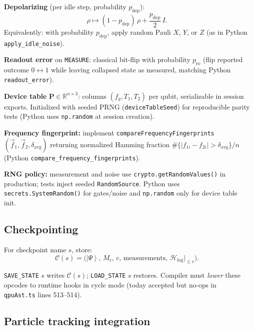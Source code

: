 \documentclass[11pt,a4paper]{article}
\newcommand{\R}{\mathbb{R}}
\newcommand{\ket}[1]{\left|#1\right\rangle}
\newcommand{\HS}{\mathcal{H}_{\mathrm{log}}}
\begin{document}
\textbf{Depolarizing} (per idle step, probability $p_{\mathrm{dep}}$):
\begin{equation}
  \rho \mapsto (1-p_{\mathrm{dep}})\,\rho + \frac{p_{\mathrm{dep}}}{2}\, I.
\end{equation}
Equivalently: with probability $p_{\mathrm{dep}}$, apply random Pauli $X$, $Y$, or $Z$ (as in Python \texttt{apply\_idle\_noise}).

\textbf{Readout error} on \texttt{MEASURE}: classical bit-flip with probability $p_{\mathrm{ro}}$ (flip reported outcome $0\leftrightarrow 1$ while leaving collapsed state as measured, matching Python \texttt{readout\_error}).

\textbf{Device table} $\mathbf{P}\in\R^{n\times 3}$: columns $(f_g, T_1, T_2)$ per qubit, serializable in session exports. Initialized with seeded PRNG (\texttt{deviceTableSeed}) for reproducible parity tests (Python uses \texttt{np.random} at session creation).

\textbf{Frequency fingerprint:} implement \texttt{compareFrequencyFingerprints}$(\vec{f}_1,\vec{f}_2,\delta_{\mathrm{avg}})$ returning normalized Hamming fraction $\#\{|f_{1i}-f_{2i}|>\delta_{\mathrm{avg}}\}/n$ (Python \texttt{compare\_frequency\_fingerprints}).

\textbf{RNG policy:} measurement and noise use \texttt{crypto.getRandomValues()} in production; tests inject seeded \texttt{RandomSource}. Python uses \texttt{secrets.SystemRandom()} for gates/noise and \texttt{np.random} only for device table init.

\subsection{Checkpointing}

For checkpoint name $s$, store:
\begin{equation}
  \mathcal{C}(s) = \bigl(\ket{\Psi},\, M_c,\, c,\, \mathrm{measurements},\, \HS\big|_{\le c}\bigr).
\end{equation}

\texttt{SAVE\_STATE} $s$ writes $\mathcal{C}(s)$; \texttt{LOAD\_STATE} $s$ restores. Compiler must \emph{lower} these opcodes to runtime hooks in cycle mode (today accepted but no-ops in \texttt{qpuAst.ts} lines 513--514).

\subsection{Particle tracking integration}
\end{document}
